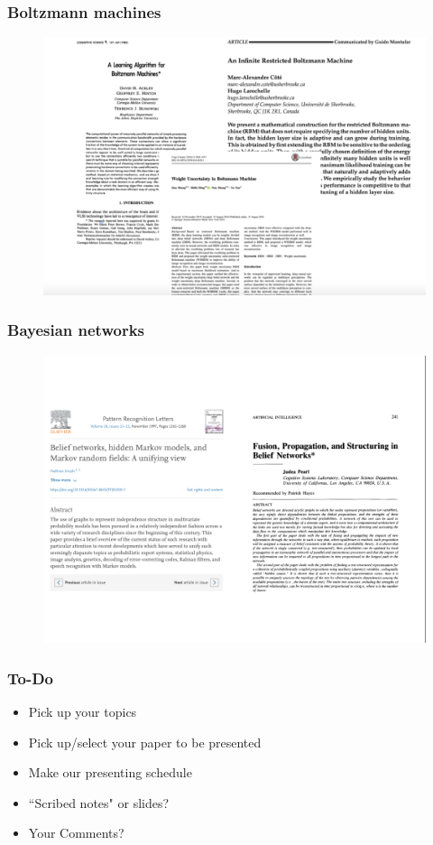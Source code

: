 \documentclass[10pt]{beamer}
\begin{document}
\begin{frame}
\frametitle{Boltzmann machines}
\begin{figure}[h!]
\centering
\includegraphics[width = \textwidth]{f8.png} 
\end{figure}  
\end{frame}

\begin{frame}
\frametitle{Bayesian networks}
\begin{figure}[h!]
\centering
\includegraphics[width = \textwidth]{f9.png} 
\end{figure}  
\end{frame}




\begin{frame}
\frametitle{To-Do}
\begin{itemize}
\item Pick up your topics
\item Pick up/select your paper to be presented
\item Make our presenting schedule
\item ``Scribed  notes" or slides?
\item Your Comments?
\end{itemize}
\end{frame}


\end{document}
